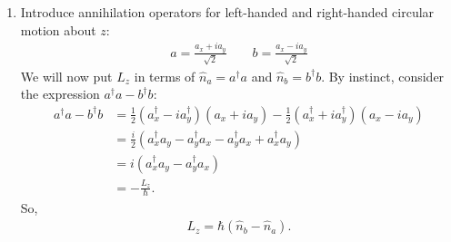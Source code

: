 \documentclass{article}
\theoremstyle{definition}
\newcommand{\f}[2]{\frac{#1}{#2}}
\newcommand{\lp}{\left(}
\newcommand{\rp}{\right)}
\begin{document}
\begin{enumerate}[label=\alph*)]
	\item Introduce annihilation operators for left-handed and right-handed circular motion about $z$:
	\begin{align*}
		a = \f{a_x + ia_y}{\sqrt{2}} \quad\quad b = \f{a_x - i a_y}{\sqrt{2}}
	\end{align*}
	We will now put $L_z$ in terms of $\hat{n}_{a} = a^\dagger a $ and $\hat{n}_b = b^\dagger b$. By instinct, consider the expression $a^\dagger a - b^\dagger b$:
	\begin{align*}
		a^\dagger a - b^\dagger b 
		&= \f{1}{2}\lp a_x^\dagger - i a_y^\dagger \rp \lp a_x + i a_y \rp - \f{1}{2}\lp a_x^\dagger + ia_y^\dagger \rp \lp a_x -ia_y \rp\\
		&= \f{i}{2}\lp a_x^\dagger a_y - a_y^\dagger a_x - a_y^\dagger a_x + a_x^\dagger a_y \rp \\
		&= i\lp a_x^\dagger a_y - a_y^\dagger a_x \rp\\
		&= -\f{L_z}{\hbar}.
	\end{align*}
	So,
	\begin{align*}
		L_z = \hbar (\hat{n}_b - \hat{n}_a).
	\end{align*}
	

\end{enumerate}
\end{document}
